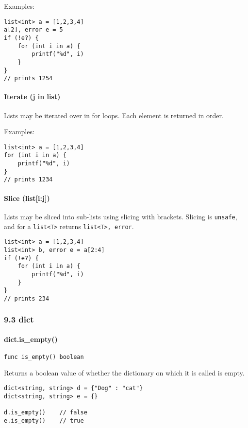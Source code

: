 \documentclass[]{article}
\begin{document}
Examples:

\begin{verbatim}
list<int> a = [1,2,3,4]
a[2], error e = 5
if (!e?) {
    for (int i in a) {
        printf("%d", i)
    } 
}
// prints 1254
\end{verbatim}

\paragraph{Iterate (j in list)}\label{iterate-j-in-list}

Lists may be iterated over in for loops. Each element is returned in
order.

Examples:

\begin{verbatim}
list<int> a = [1,2,3,4]
for (int i in a) {
    printf("%d", i)
} 
// prints 1234
\end{verbatim}

\paragraph{Slice (list{[}i:j{]})}\label{slice-listij}

Lists may be sliced into sub-lists using slicing with brackets. Slicing
is \texttt{unsafe}, and for a \texttt{list\textless{}T\textgreater{}}
returns \texttt{list\textless{}T\textgreater{}, error}.

\begin{verbatim}
list<int> a = [1,2,3,4]
list<int> b, error e = a[2:4]
if (!e?) {
    for (int i in a) {
        printf("%d", i)
    } 
}
// prints 234
\end{verbatim}

\subsubsection{9.3 dict}\label{dict}

\paragraph{dict.is\_empty()}\label{dict.isux5fempty}

\begin{verbatim}
func is_empty() boolean
\end{verbatim}

Returns a boolean value of whether the dictionary on which it is called
is empty.

\begin{verbatim}
dict<string, string> d = {"Dog" : "cat"}
dict<string, string> e = {}

d.is_empty()    // false
e.is_empty()    // true
\end{verbatim}
\end{document}
